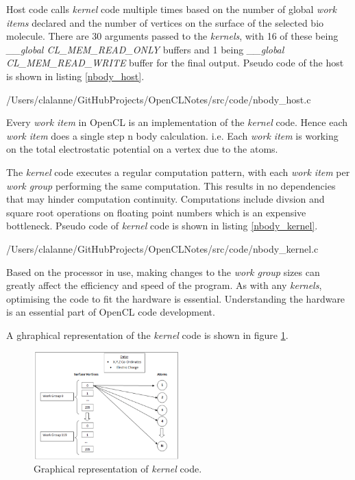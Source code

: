 \par{Host code calls \emph{kernel} code multiple times based on the 
    number of global \emph{work items} declared and the number of vertices 
    on the surface of the selected bio molecule. There are 30 arguments 
    passed to the \emph{kernels}, with 16 of these being 
    \emph{\_\_global CL\_MEM\_READ\_ONLY}
    buffers and 1 being \emph{\_\_global CL\_MEM\_READ\_WRITE} buffer 
    for the final output. Pseudo code of the host is shown in listing 
    \ref{nbody_host}.}


                {/Users/clalanne/GitHubProjects/OpenCLNotes/src/code/nbody_host.c}

\par{Every \emph{work item} in OpenCL is an implementation of the \emph{kernel} code. 
    Hence each \emph{work item} does a single step n body calculation. 
    i.e. Each \emph{work item} is working on the total electrostatic 
    potential on a vertex due to the atoms.}

\par{The \emph{kernel} code executes a regular computation pattern, 
    with each \emph{work item} per \emph{work group} performing the same computation. 
    This results in no dependencies that may hinder computation continuity. 
    Computations include divsion and square root operations on floating point 
    numbers which is an expensive bottleneck. Pseudo code of \emph{kernel} code
    is shown in listing \ref{nbody_kernel}.}


                {/Users/clalanne/GitHubProjects/OpenCLNotes/src/code/nbody_kernel.c}

\par{Based on the processor in use, making changes to the \emph{work group} sizes 
    can greatly affect the efficiency and speed of the program. 
    As with any \emph{kernels}, optimising the code to fit the hardware is essential. 
    Understanding the hardware is an essential part of OpenCL 
    code development.}

\par{A ghraphical representation of the \emph{kernel} code is shown in figure 
    \ref{nbody_graph}.}

\begin{figure}[!h]
    \centering
    \includegraphics[width=0.5\textwidth]{figures/graph_nbody.png}
    \caption{Graphical representation of \emph{kernel} code.}
    \label{nbody_graph}
\end{figure}





